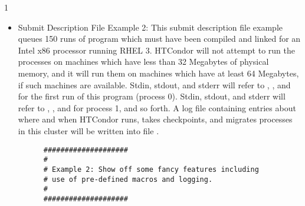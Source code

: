 \begin{ManPage}{\label{man-condor-submit}}{1}
\begin{itemize}
\begin{verbatim}
      Arguments      = 45 6000                                               
      Output  = foo.out2                                                     
      Error   = foo.err2
      Queue                   
\end{verbatim}
\normalsize

Or you can get the same results as the above submit file by using a list of arguments with the Queue statement

\footnotesize
\begin{verbatim}
      ####################
      #
      # submit description file
      # Example 1b: queuing multiple jobs with differing
      # command line arguments and output files, alternate syntax
      #                                                                      
      ####################                                                   

      Executable     = foo
      Universe       = vanilla

      # generate different output and error filenames for each process
      Output  = foo.out$(Process)
      Error   = foo.err$(Process)

      Queue Arguments From (
        15 2000
        30 2000
        45 6000
      )

\end{verbatim}
\normalsize

\item{Submit Description File Example 2:} This submit description file
example queues 150
runs of program  which must have been compiled and linked for
an Intel x86 processor running RHEL 3.
HTCondor will not attempt
to run the processes on machines which have less than 32 Megabytes of
physical memory, and it will run them on machines which have at least 64
Megabytes, if such machines are available.
Stdin, stdout, and stderr will
refer to , , and  for the first run
of this program (process 0).
Stdin, stdout, and stderr will refer to
, , and  for process 1, and so forth.
A log file containing entries
about where and when HTCondor runs, takes checkpoints, and migrates processes
in this cluster will be written into file .

\footnotesize
\begin{verbatim}
      ####################                                                    
      #                                                                       
      # Example 2: Show off some fancy features including
      # use of pre-defined macros and logging.                                
      #                                                                       
      ####################                                                    
                                                                          

\end{verbatim}
\end{itemize}
\end{ManPage}

